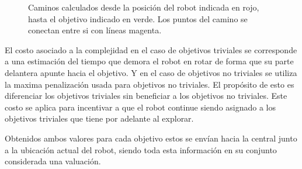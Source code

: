 \begin{figure}[H]
  \centerfloat

  \qquad

  \caption[Camino.]{Caminos calculados desde la posición del robot indicada en
  rojo, hasta el objetivo indicado en verde. Los puntos del camino se conectan
entre si con líneas magenta.}\label{fig:camino}

\end{figure}


El costo asociado a la complejidad en el caso de objetivos triviales se
corresponde a una estimación del tiempo que demora el robot en rotar de forma
que su parte delantera apunte hacia el objetivo. Y en el caso de objetivos no
triviales se utiliza la maxima penalización usada para objetivos no triviales.
El propósito de esto es diferenciar los objetivos triviales sin beneficiar a
los objetivos no triviales. Este costo se aplica para incentivar a que el robot
continue siendo asignado a los objetivos triviales que tiene por adelante al
explorar.

Obtenidos ambos valores para cada objetivo estos se envían hacia la central
junto a la ubicación actual del robot, siendo toda esta información en su
conjunto considerada una valuación. %

